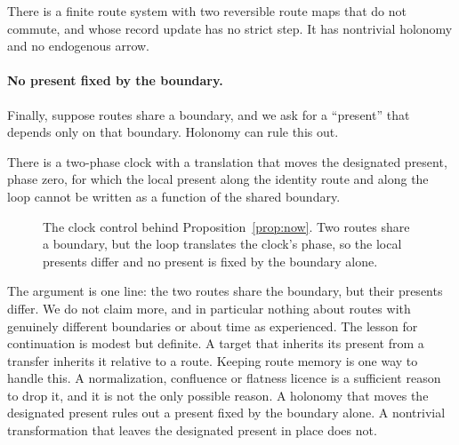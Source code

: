 \begin{proposition}
\label{prop:holonomy}
There is a finite route system with two reversible route maps that do not
commute, and whose record update has no strict step. It has nontrivial holonomy
and no endogenous arrow.
\end{proposition}

\paragraph{No present fixed by the boundary.}
Finally, suppose routes share a boundary, and we ask for a ``present'' that
depends only on that boundary. Holonomy can rule this out.

\begin{proposition}
\label{prop:now}
There is a two-phase clock with a translation that moves the designated
present, phase zero, for which the local present along the identity route and
along the loop cannot be written as a function of the shared boundary.
\end{proposition}

\begin{figure}[tbp]
\centering

\caption{The clock control behind Proposition~\ref{prop:now}. Two routes share a boundary, but the loop translates the clock's phase, so the local presents differ and no present is fixed by the boundary alone.}
\label{fig:clock}
\end{figure}

The argument is one line: the two routes share the boundary, but their
presents differ. We do not claim more, and in particular nothing about routes
with genuinely different boundaries or about time as experienced. The lesson for
continuation is modest but definite. A target that inherits its present from a
transfer inherits it relative to a route. Keeping route memory is one way to
handle this. A normalization, confluence or flatness licence is a sufficient
reason to drop it, and it is not the only possible reason. A holonomy that
moves the designated present rules out a present fixed by the boundary alone.
A nontrivial transformation that leaves the designated present in place does
not.
